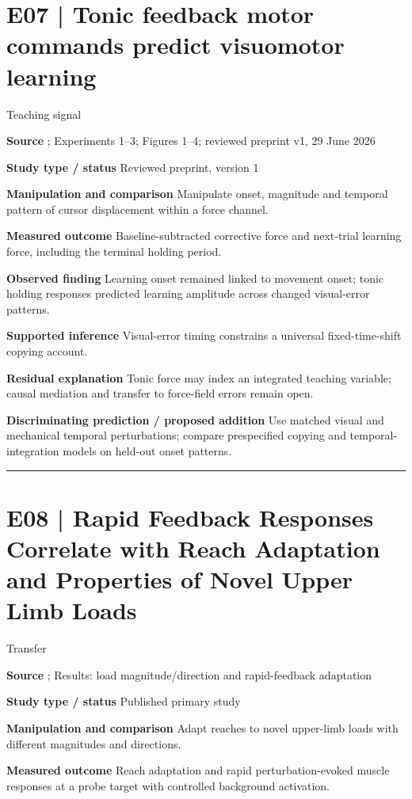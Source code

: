 \documentclass[11pt,a4paper]{article}
\begin{document}
\clearpage\section{E07 | Tonic feedback motor commands predict visuomotor learning}
{\small\sffamily\color{navy} Teaching signal}\par
\textbf{Source} \cite{makino2026}; Experiments 1--3; Figures 1--4; reviewed preprint v1, 29 June 2026\par
\textbf{Study type / status} Reviewed preprint, version 1\par
\textbf{Manipulation and comparison} Manipulate onset, magnitude and temporal pattern of cursor displacement within a force channel.\par
\textbf{Measured outcome} Baseline-subtracted corrective force and next-trial learning force, including the terminal holding period.\par
\textbf{Observed finding} Learning onset remained linked to movement onset; tonic holding responses predicted learning amplitude across changed visual-error patterns.\par
\textbf{Supported inference} Visual-error timing constrains a universal fixed-time-shift copying account.\par
\textbf{Residual explanation} Tonic force may index an integrated teaching variable; causal mediation and transfer to force-field errors remain open.\par
\textbf{Discriminating prediction / proposed addition} Use matched visual and mechanical temporal perturbations; compare prespecified copying and temporal-integration models on held-out onset patterns.\par
\bigskip\hrule\medskip\section{E08 | Rapid Feedback Responses Correlate with Reach Adaptation and Properties of Novel Upper Limb Loads}
{\small\sffamily\color{navy} Transfer}\par
\textbf{Source} \cite{cluff2013}; Results: load magnitude/direction and rapid-feedback adaptation\par
\textbf{Study type / status} Published primary study\par
\textbf{Manipulation and comparison} Adapt reaches to novel upper-limb loads with different magnitudes and directions.\par
\textbf{Measured outcome} Reach adaptation and rapid perturbation-evoked muscle responses at a probe target with controlled background activation.\par
\end{document}

